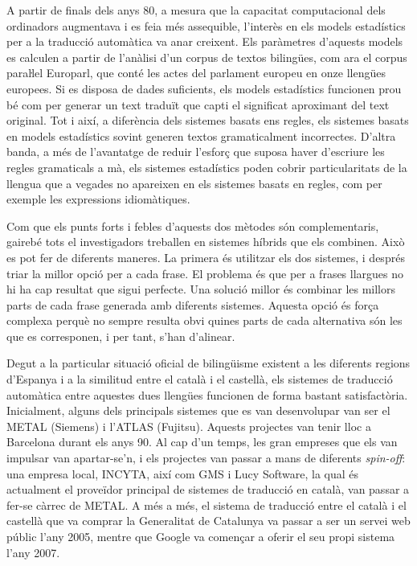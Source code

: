\documentclass[]{../../metanetpaper}
\begin{document}
\begin{multicols}{2}
A partir de finals dels anys 80, a mesura que la capacitat computacional dels ordinadors augmentava i es feia més assequible, l’interès en els models estadístics per a la traducció automàtica va anar creixent. Els paràmetres d’aquests models es calculen a partir de l’anàlisi d’un corpus de textos bilingües, com ara el corpus paraŀlel Europarl, que conté les actes del parlament europeu en onze llengües europees. Si es disposa de dades suficients, els models estadístics funcionen prou bé com per generar un text traduït que capti el significat aproximant del text original. Tot i així, a diferència dels sistemes basats ens regles, els sistemes basats en models estadístics sovint generen textos gramaticalment incorrectes. D’altra banda, a més de l’avantatge de reduir l’esforç que suposa haver d’escriure les regles gramaticals a mà, els sistemes estadístics poden cobrir particularitats de la llengua que a vegades no apareixen en els sistemes basats en regles, com per exemple les expressions idiomàtiques. 

Com que els punts forts i febles d’aquests dos mètodes són complementaris, gairebé tots el investigadors treballen en sistemes híbrids que els combinen. Això es pot fer de diferents maneres. La primera és utilitzar els dos sistemes, i després triar la millor opció per a cada frase. El problema és que per a frases llargues no hi ha cap resultat que sigui perfecte. Una solució millor és combinar les millors parts de cada frase generada amb diferents sistemes. Aquesta opció és força complexa perquè no sempre resulta obvi quines parts de cada alternativa són les que es corresponen, i per tant, s’han d’alinear.

Degut a la particular situació oficial de bilingüisme existent a les diferents regions d’Espanya i a la similitud entre el català i el castellà, els sistemes de traducció automàtica entre aquestes dues llengües funcionen de forma bastant satisfactòria. Inicialment, alguns dels principals sistemes que es van desenvolupar van ser el METAL (Siemens) i l’ATLAS (Fujitsu). Aquests projectes van tenir lloc a Barcelona durant els anys 90. Al cap d’un temps, les gran empreses que els van impulsar van apartar-se’n, i els projectes van passar a mans de diferents \textit{spin-off}: una empresa local, INCYTA, així com GMS i Lucy Software, la qual és actualment el proveïdor principal de sistemes de traducció en català, van passar a fer-se càrrec de METAL. A més a més, el sistema de traducció entre el català i el castellà que va comprar la Generalitat de Catalunya va passar a ser un servei web públic l’any 2005, mentre que Google va començar a oferir el seu propi sistema l’any 2007.


\end{multicols}
\end{document}
